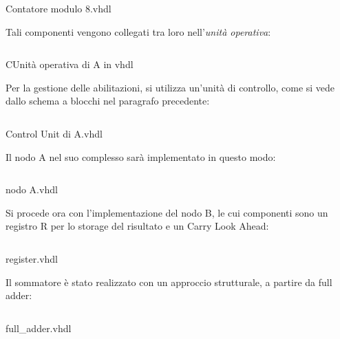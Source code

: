 \begin{code}
    \inputminted[frame=lines, framesep=2mm, baselinestretch=1.2, bgcolor=LightGray, fontsize=\footnotesize, linenos]{vhdl}{vhdl_files/preappDicembre/count_8.vhd}
    \caption{Contatore modulo 8.vhdl}
    \label{lst:mux_2_1}
\end{code}
Tali componenti vengono collegati tra loro nell'\textit{unità operativa}:
\begin{code}
    \inputminted[frame=lines, framesep=2mm, baselinestretch=1.2, bgcolor=LightGray, fontsize=\footnotesize, linenos]{vhdl}{vhdl_files/preappDicembre/unita_operativa.vhd}
    \caption{CUnità operativa di A in vhdl}
    \label{lst:mux_2_1}
\end{code}
Per la gestione delle abilitazioni, si utilizza un'unità di controllo, come si vede dallo schema a blocchi nel paragrafo precedente:
\begin{code}
    \inputminted[frame=lines, framesep=2mm, baselinestretch=1.2, bgcolor=LightGray, fontsize=\footnotesize, linenos]{vhdl}{vhdl_files/preappDicembre/UCA.vhd}
    \caption{Control Unit di A.vhdl}
    \label{lst:mux_2_1}
\end{code}
Il nodo A nel suo complesso sarà implementato in questo modo:
\begin{code}
    \inputminted[frame=lines, framesep=2mm, baselinestretch=1.2, bgcolor=LightGray, fontsize=\footnotesize, linenos]{vhdl}{vhdl_files/preappDicembre/A.vhd}
    \caption{nodo A.vhdl}
    \label{lst:mux_2_1}
\end{code}
Si procede ora con l'implementazione del nodo B, le cui componenti sono un registro R per lo storage del risultato e un Carry Look Ahead:
\begin{code}
    \inputminted[frame=lines, framesep=2mm, baselinestretch=1.2, bgcolor=LightGray, fontsize=\footnotesize, linenos]{vhdl}{vhdl_files/preappDicembre/register.vhd}
    \caption{register.vhdl}
    \label{lst:mux_2_1}
\end{code}
Il sommatore è stato realizzato con un approccio strutturale, a partire da full adder:
\begin{code}
    \inputminted[frame=lines, framesep=2mm, baselinestretch=1.2, bgcolor=LightGray, fontsize=\footnotesize, linenos]{vhdl}{vhdl_files/preappDicembre/full_adder.vhd}
    \caption{full\_adder.vhdl}
    \label{lst:mux_2_1}
\end{code}

